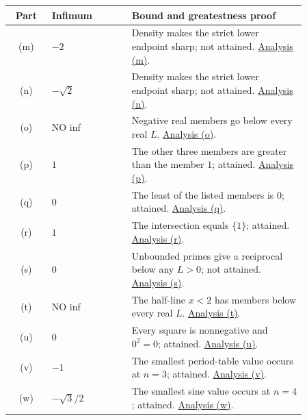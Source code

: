 \begin{center}
\begin{tabular}{@{}c@{\quad}p{0.27\linewidth}@{\quad}p{0.59\linewidth}@{}}
\toprule
Part&Infimum&Bound and greatestness proof\\ \midrule
(m)&$-2$&Density makes the strict lower endpoint sharp; not attained. \hyperref[bounds:m]{Analysis (m)}.\\
(n)&$-\sqrt2$&Density makes the strict lower endpoint sharp; not attained. \hyperref[bounds:n]{Analysis (n)}.\\
(o)&NO inf&Negative real members go below every real $L$. \hyperref[bounds:o]{Analysis (o)}.\\
(p)&$1$&The other three members are greater than the member $1$; attained. \hyperref[bounds:p]{Analysis (p)}.\\
(q)&$0$&The least of the listed members is $0$; attained. \hyperref[bounds:q]{Analysis (q)}.\\
(r)&$1$&The intersection equals $\{1\}$; attained. \hyperref[bounds:r]{Analysis (r)}.\\
(s)&$0$&Unbounded primes give a reciprocal below any $L>0$; not attained. \hyperref[bounds:s]{Analysis (s)}.\\
(t)&NO inf&The half-line $x<2$ has members below every real $L$. \hyperref[bounds:t]{Analysis (t)}.\\
(u)&$0$&Every square is nonnegative and $0^2=0$; attained. \hyperref[bounds:u]{Analysis (u)}.\\
(v)&$-1$&The smallest period-table value occurs at $n=3$; attained. \hyperref[bounds:v]{Analysis (v)}.\\
(w)&$-\sqrt3/2$&The smallest sine value occurs at $n=4$; attained. \hyperref[bounds:w]{Analysis (w)}.\\
\bottomrule
\end{tabular}
\end{center}

